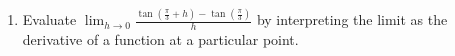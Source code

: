 \documentclass[12pt]{article}
\newif\ifans
\begin{document}
\begin{enumerate}
\ifans{\fbox{\parbox{0.5\linewidth}{
\begin{align*}
\frac{d}{dx}(\csc{x})&=\frac{d}{dx}\left(\frac{1}{\sin{x}}\right)\\
&=\frac{(\sin{x})(0)-(1)(\cos{x})}{\sin^2{x}}\\
&=-\frac{\cos{x}}{\sin^2{x}}\\
&=-\frac{1}{\sin{x}}\frac{\cos{x}}{\sin{x}}\\
&=-\csc{x}\cot{x}
\end{align*}
}}} \fi

\item Evaluate $\lim_{h \rightarrow 0}{\frac{\tan{\left(\frac{\pi}{3}+h\right)}-\tan{\left(\frac{\pi}{3}\right)}}{h}}$ by interpreting the limit as the derivative of a function at a particular point.

\ifans{\fbox{$\lim_{h \rightarrow 0}{\frac{\tan{\left(\frac{\pi}{3}+h\right)}-\tan{\left(\frac{\pi}{3}\right)}}{h}}=\left.\frac{d}{dx}(\tan{x})\right|_{x=\frac{\pi}{3}}=\sec^2{\left(\frac{\pi}{3}\right)}=4$}} \fi

\end{enumerate}

\newpage

\end{document}
